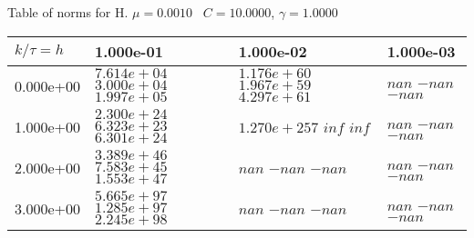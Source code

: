 \begin{center}
Table of norms for H. $\mu = 0.0010$ \, $C = 10.0000$, $\gamma = 1.0000$
  
\begin{tabular}{|p{1in}|p{1in}|p{1in}|p{1in}|} \hline
$k / \tau = h$ &1.000e-01 &1.000e-02 &1.000e-03 \\ \hline 
0.000e+00 & $7.614e+04$  $3.000e+04$  $1.997e+05$  & $1.176e+60$  $1.967e+59$  $4.297e+61$  & $nan$  $-nan$  $-nan$  \\ \hline 
1.000e+00 & $2.300e+24$  $6.323e+23$  $6.301e+24$  & $1.270e+257$  $inf$  $inf$  & $nan$  $-nan$  $-nan$  \\ \hline 
2.000e+00 & $3.389e+46$  $7.583e+45$  $1.553e+47$  & $nan$  $-nan$  $-nan$  & $nan$  $-nan$  $-nan$  \\ \hline 
3.000e+00 & $5.665e+97$  $1.285e+97$  $2.245e+98$  & $nan$  $-nan$  $-nan$  & $nan$  $-nan$  $-nan$  \\ \hline 

\end{tabular}\\[20pt]
\end{center}
